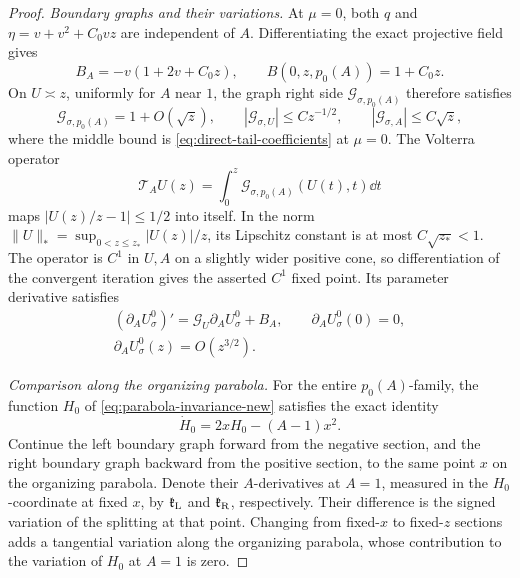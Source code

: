 \begin{proof}
\emph{Boundary graphs and their variations.}
At \(\mu=0\), both \(q\) and \(\eta=v+v^2+C_0vz\) are independent of \(A\).
Differentiating the exact projective field gives
\begin{equation}
\label{eq:sharpness-B-variation}
 B_A=-v(1+2v+C_0z),\qquad B(0,z,p_0(A))=1+C_0z.
\end{equation}
On \(U\asymp z\), uniformly for \(A\) near \(1\), the graph
right side \(\mathcal G_{\sigma,p_0(A)}\) therefore satisfies
\[
 \mathcal G_{\sigma,p_0(A)}=1+O(\sqrt z),\qquad
 |\mathcal G_{\sigma,U}|\le Cz^{-1/2},\qquad
 |\mathcal G_{\sigma,A}|\le C\sqrt z,
\]
where the middle bound is \eqref{eq:direct-tail-coefficients} at
\(\mu=0\).
The Volterra operator
\[
 \mathcal T_AU(z)=\int_0^z\mathcal G_{\sigma,p_0(A)}(U(t),t)\dd t
\]
maps \(|U(z)/z-1|\le1/2\) into itself. In the norm
\(\|U\|_*=\sup_{0<z\le z_*}|U(z)|/z\), its Lipschitz
constant is at most \(C\sqrt{z_*}<1\).
The operator is \(C^1\) in \(U,A\) on a slightly wider positive
cone, so differentiation of the convergent iteration gives
the asserted \(C^1\) fixed point. Its parameter derivative satisfies
\begin{equation}
\label{eq:sharpness-origin-variation}
 \begin{gathered}
 (\partial_AU_\sigma^0)'=\mathcal G_U\partial_AU_\sigma^0+B_A,\qquad
 \partial_AU_\sigma^0(0)=0,\\
 \partial_AU_\sigma^0(z)=O(z^{3/2}).
 \end{gathered}
\end{equation}

\emph{Comparison along the organizing parabola.}
For the entire \(p_0(A)\)-family, the function \(H_0\) of
\eqref{eq:parabola-invariance-new} satisfies the exact identity
\begin{equation}
\label{eq:sharpness-affine-variation}
 \dot H_0=2xH_0-(A-1)x^2.
\end{equation}
Continue the left boundary graph forward from the negative section,
and the right boundary graph backward from the positive section,
to the same point \(x\) on the organizing parabola. Denote their
\(A\)-derivatives at \(A=1\), measured in the \(H_0\)-coordinate
at fixed \(x\), by \(\mathfrak k_{\rm L}\) and
\(\mathfrak k_{\rm R}\), respectively. Their difference is the
signed variation of the splitting at that point. Changing from
fixed-\(x\) to fixed-\(z\) sections adds a tangential variation
along the organizing parabola, whose contribution to the variation
of \(H_0\) at \(A=1\) is zero.


\end{proof}
